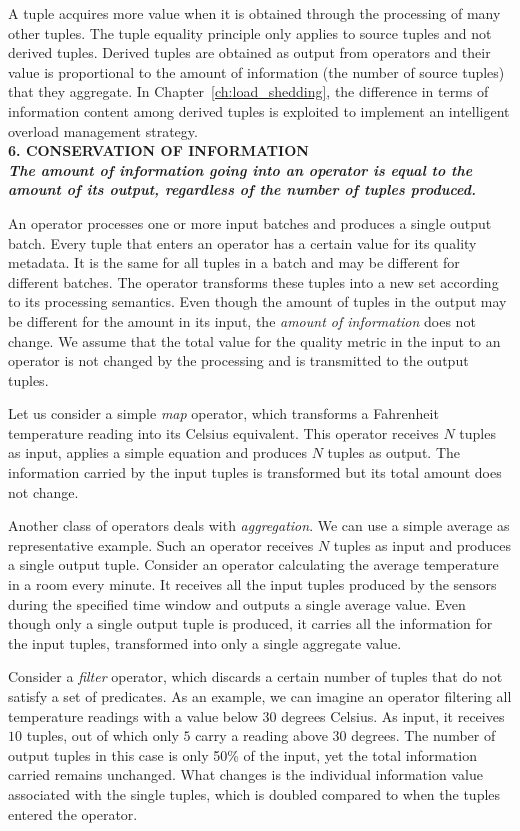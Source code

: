 A tuple acquires more value when it is obtained through the processing of many other tuples. The tuple
equality principle only applies to source tuples and not derived tuples. Derived tuples are obtained as
output from operators and their value is proportional to the amount of information (\ie the number of source
tuples) that they aggregate. In Chapter~\ref{ch:load_shedding}, the difference in terms of information content among derived tuples is exploited
to implement an intelligent overload management strategy. \\

\textbf{6. CONSERVATION OF INFORMATION \\ \textit{The amount of information going into an operator is
equal to the amount of its output, regardless of the number of tuples produced.}}
 
An operator processes one or more input batches and produces a single output batch. Every tuple that
enters an operator has a certain value for its quality metadata.  It is the same for all tuples in a
batch and may be different for different batches. The operator transforms these tuples into a new set
according to its processing semantics. Even though the amount of tuples in the output may be different for 
the amount in its input, the \textit{amount of information} does not change. We assume that the
total value for the quality metric in the input to an operator is not changed by the processing and is
transmitted to the output tuples.
 
 	Let us consider a simple \textit{map} operator, which transforms a Fahrenheit temperature reading into
 	its Celsius equivalent. This operator receives $N$ tuples as input, applies a simple equation and
 	produces $N$ tuples as output. The information carried by the input tuples is transformed but its
 	total amount does not change. 
 	
Another class of operators deals with \textit{aggregation}. We can use a simple average as representative
example. Such an operator receives $N$ tuples as input and produces a single output tuple.
Consider an operator calculating the average temperature in a room every minute. It receives all the
input tuples produced by the sensors during the specified time window and outputs a single average value.
Even though only a single output tuple is produced, it carries all the information for the input tuples,
transformed into only a single aggregate value.
 	
Consider a \textit{filter} operator, which discards a certain number of tuples that do not satisfy a set
of predicates. As an example, we can imagine an operator filtering all temperature readings with a value
below $30$ degrees Celsius. As input, it receives $10$ tuples, out of which only $5$ carry a reading
above $30$ degrees. The number of output tuples in this case is only 50\% of the input, yet the total
information carried remains unchanged. What changes is the individual information value associated with
the single tuples, which is doubled compared to when the tuples entered the operator.
 	
